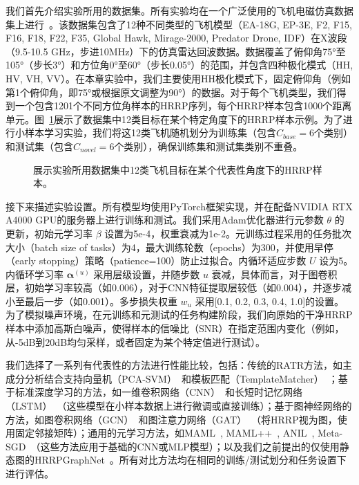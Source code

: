 我们首先介绍实验所用的数据集。所有实验均在一个广泛使用的飞机电磁仿真数据集上进行~\cite{Chen2024, Liu2024, liu2024scnet, liu2021multi, liu2025attribute}。该数据集包含了12种不同类型的飞机模型（EA-18G, EP-3E, F2, F15, F16, F18, F22, F35, Global Hawk, Mirage-2000, Predator Drone, IDF）在X波段（9.5-10.5 GHz，步进10MHz）下的仿真雷达回波数据。数据覆盖了俯仰角75°至105°（步长3°）和方位角0°至60°（步长0.05°）的范围，并包含四种极化模式（HH, HV, VH, VV）。在本章实验中，我们主要使用HH极化模式下，固定俯仰角（例如第1个俯仰角，即75°或根据原文调整为90°）的数据。对于每个飞机类型，我们得到一个包含1201个不同方位角样本的HRRP序列，每个HRRP样本包含1000个距离单元。图~\ref{fig:dataset_chap3}展示了数据集中12类目标在某个特定角度下的HRRP样本示例。为了进行小样本学习实验，我们将这12类飞机随机划分为训练集（包含$C_{base}=6$个类别）和测试集（包含$C_{novel}=6$个类别），确保训练集和测试集类别不重叠。

\begin{figure}[h!]
    \centering
    \caption{展示实验所用数据集中12类飞机目标在某个代表性角度下的HRRP样本。}
    \label{fig:dataset_chap3}
\end{figure}

接下来描述实验设置。所有模型均使用PyTorch框架实现，并在配备NVIDIA RTX A4000 GPU的服务器上进行训练和测试。我们采用Adam优化器进行元参数 $\theta$ 的更新，初始元学习率 $\beta$ 设置为5e-4，权重衰减为1e-2。元训练过程采用的任务批次大小（batch size of tasks）为4，最大训练轮数（epochs）为300，并使用早停（early stopping）策略（patience=100）防止过拟合。内循环适应步数 $U$ 设为5。内循环学习率 $\boldsymbol{\alpha}^{(u)}$ 采用层级设置，并随步数 $u$ 衰减，具体而言，对于图卷积层，初始学习率较高（如0.006），对于CNN特征提取层较低（如0.004），并逐步减小至最后一步（如0.001）。多步损失权重 $w_u$ 采用[0.1, 0.2, 0.3, 0.4, 1.0]的设置。为了模拟噪声环境，在元训练和元测试的任务构建阶段，我们向原始的干净HRRP样本中添加高斯白噪声，使得样本的信噪比（SNR）在指定范围内变化（例如，从-5dB到20dB均匀采样，或者固定为某个特定值进行测试）。

我们选择了一系列有代表性的方法进行性能比较，包括：传统的RATR方法，如主成分分析结合支持向量机（PCA-SVM）~\cite{Liu2020}和模板匹配（TemplateMatcher）~\cite{Cui2022}；基于标准深度学习的方法，如一维卷积网络（CNN）~\cite{Song2019}和长短时记忆网络（LSTM）~\cite{liu2021multi}（这些模型在小样本数据上进行微调或直接训练）；基于图神经网络的方法，如图卷积网络（GCN）~\cite{kipf2017semi}和图注意力网络（GAT）~\cite{velickovic2018graph}（将HRRP视为图，使用固定邻接矩阵）；通用的元学习方法，如MAML~\cite{Finn2017}, MAML++~\cite{Antoniou2018}, ANIL~\cite{raghu2020rapid}, Meta-SGD~\cite{li2017meta}（这些方法应用于基础的CNN或MLP模型）；以及我们之前提出的仅使用静态图的HRRPGraphNet~\cite{Chen2024}。所有对比方法均在相同的训练/测试划分和任务设置下进行评估。

